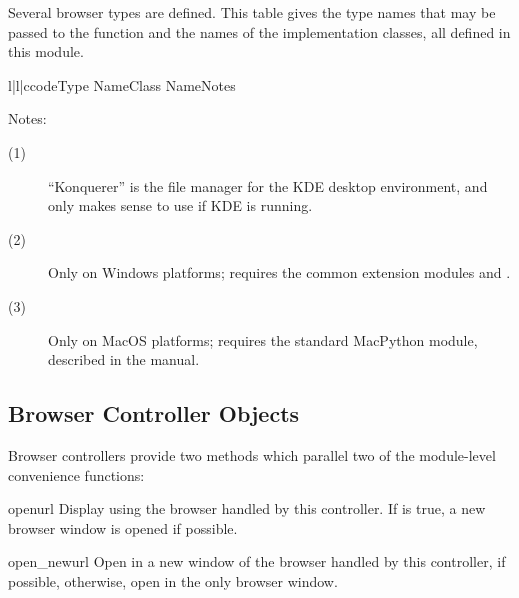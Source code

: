 Several browser types are defined.  This table gives the type names
that may be passed to the  function and the names of
the implementation classes, all defined in this module.

\begin{tableiii}{l|l|c}{code}{Type Name}{Class Name}{Notes}
\end{tableiii}

\noindent
Notes:

\begin{description}
\item[(1)]
``Konquerer'' is the file manager for the KDE desktop environment, and
only makes sense to use if KDE is running.

\item[(2)]
Only on Windows platforms; requires the common
extension modules  and .

\item[(3)]
Only on MacOS platforms; requires the standard MacPython 
module, described in the  manual.
\end{description}


\subsection{Browser Controller Objects \label{browser-controllers}}

Browser controllers provide two methods which parallel two of the
module-level convenience functions:

\begin{funcdesc}{open}{url}
  Display  using the browser handled by this controller.  If
   is true, a new browser window is opened if possible.
\end{funcdesc}

\begin{funcdesc}{open_new}{url}
  Open  in a new window of the browser handled by this
  controller, if possible, otherwise, open  in the only
  browser window.
\end{funcdesc}
